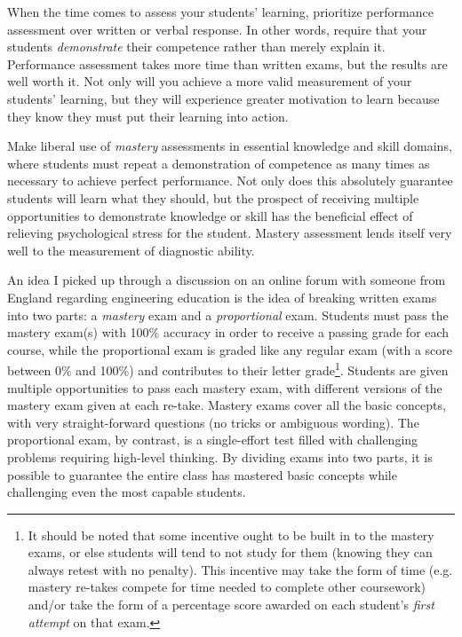When the time comes to assess your students' learning, prioritize performance assessment over written or verbal response.  In other words, require that your students \textit{demonstrate} their competence rather than merely explain it.  Performance assessment takes more time than written exams, but the results are well worth it.  Not only will you achieve a more valid measurement of your students' learning, but they will experience greater motivation to learn because they know they must put their learning into action.

Make liberal use of \textit{mastery} assessments in essential knowledge and skill domains, where students must repeat a demonstration of competence as many times as necessary to achieve perfect performance.  Not only does this absolutely guarantee students will learn what they should, but the prospect of receiving multiple opportunities to demonstrate knowledge or skill has the beneficial effect of relieving psychological stress for the student.  Mastery assessment lends itself very well to the measurement of diagnostic ability.

An idea I picked up through a discussion on an online forum with someone from England regarding engineering education is the idea of breaking written exams into two parts: a \textit{mastery} exam and a \textit{proportional} exam.  Students must pass the mastery exam(s) with 100\% accuracy in order to receive a passing grade for each course, while the proportional exam is graded like any regular exam (with a score between 0\% and 100\%) and contributes to their letter grade\footnote{It should be noted that some incentive ought to be built in to the mastery exams, or else students will tend to not study for them (knowing they can always retest with no penalty).  This incentive may take the form of time (e.g. mastery re-takes compete for time needed to complete other coursework) and/or take the form of a percentage score awarded on each student's \textit{first attempt} on that exam.}.  Students are given multiple opportunities to pass each mastery exam, with different versions of the mastery exam given at each re-take.  Mastery exams cover all the basic concepts, with very straight-forward questions (no tricks or ambiguous wording).  The proportional exam, by contrast, is a single-effort test filled with challenging problems requiring high-level thinking.  By dividing exams into two parts, it is possible to guarantee the entire class has mastered basic concepts while challenging even the most capable students.

